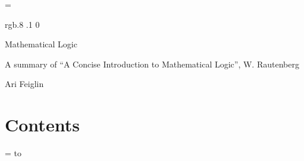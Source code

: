 \def\qed{%
    \ifmmode \eqno\mathchar"404%
    \else%
        \hskip1cm\penalty0\null\nobreak\hfill$\mathchar"404$%
        \par\medskip%
    \fi%
}

%

\newcount\mlcount
\def\gentzen#1#2{%
    \,\vcenter{%
        \tabskip=.15cm\relax%
        \mlcount=1\relax%
        \offinterlineskip%
        \halign{\strut\hfil$\displaystyle{##}$\hfil&&\global\advance\mlcount by 1\relax\vrule\kern.15cm$\displaystyle{##}$\cr%
            #1\cr\noalign{\kern.1\jot\hrule\kern1\jot}%
            \multispan{\the\mlcount}\hfil$#2$\hfil\cr
        }%
    }\,%
}

\footline={}



\color rgb{.8 .1 0}

{\def\boxshadowcolor{rgb{.8 .8 0}}

    \centerline{Mathematical Logic}
    \smallskip
    \centerline{A summary of ``A Concise Introduction to Mathematical Logic'', W. Rautenberg}
    \centerline{Ari Feiglin}

\eppbox

\bigskip

\section*{Contents}

\tableofcontents
\eppbox

}

\vfill\break

\color{black}

\null
\vfill\break

\newif\ifpageodd
\pageoddtrue
\headline={%
    \hbox to \hsize{\color{black}%
        \ifpageodd\hfil{\it\currsubsection\quad\bf\folio}\global\pageoddfalse%
        \else{\bf\folio\quad\it\currsubsection}\hfil\global\pageoddtrue\fi%
    }%
}

